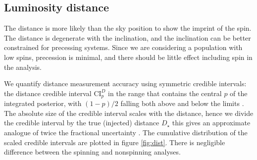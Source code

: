 \subsection{Luminosity distance}\label{sec:distance}

The distance is more likely than the sky position to show the imprint of the spin. The distance is degenerate with the inclination, and the inclination can be better constrained for precessing systems. Since we are considering a population with low spins, precession is minimal, and there should be little effect including spin in the analysis.

We quantify distance measurement accuracy using symmetric credible intervals: the distance credible interval $\mathrm{CI}_p^{D}$ in the range that contains the central $p$ of the integrated posterior, with $(1-p)/2$ falling both above and below the limits \citep{Aasi_2013}. The absolute size of the credible interval scales with the distance, hence we divide the credible interval by the true (injected) distance $D_\star$ this gives an approximate analogue of twice the fractional uncertainty \citep{Berry_2014}. The cumulative distribution of the scaled credible intervals are plotted in figure \ref{fig:dist}. There is negligible difference between the spinning and nonspinning analyses.

